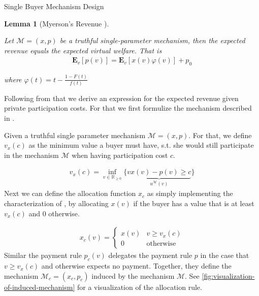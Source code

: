 \documentclass[11pt,a4paper]{article}
\newtheorem{lemma}[theorem]{Lemma}
\newcommand{\RR}{\ensuremath{\mathbb{R}}}
\newcommand{\1}[1]{\mbox{\rm\bf 1}_{#1}}
\begin{document}
\begin{section}{Single Buyer Mechanism Design}
 \begin{lemma}[Myerson's Revenue \cite{myerson}]
     \label{lemma:myerson-revenue}

     Let $\mathcal{M}=(x,p)$ be a truthful single-parameter mechanism, then the expected revenue equals the expected virtual welfare. That is
     \begin{align*}
         \mathbf{E}_v\left[p(v)\right]
         = \mathbf{E}_v\left[x(v)\varphi(v)\right] + p_0
     \end{align*}

     where $\varphi(t) = t - \frac{1 - F(t)}{f(t)}$
 \end{lemma}

 Following from that we derive an expression for the expected revenue given private participation costs.
 For that we first formulize the mechanism described in .

 Given a truthful single parameter mechanism $\mathcal{M}=(x,p)$.
 For that, we define $v_x(c)$ as the minimum value a buyer must have, s.t. she would still participate in the mechanism $\mathcal{M}$ when having participation cost $c$.

 \begin{align*}
     v_x(c) = \inf_{v \in \RR_{\geq 0}} \{\underbrace{vx(v) - p(v) \geq c}_{u^\mathcal{M}(v)}\}
 \end{align*}
 Next we can define the allocation function $x_c$ as simply implementing the characterization of ,
 by allocating $x(v)$ if the buyer has a value that is at least $v_x(c)$ and $0$ otherwise.

 \begin{align*}
     x_c(v) = \begin{cases}
                  x(v) & v \geq v_x(c)    \\
                  0    & \text{otherwise}
              \end{cases}
 \end{align*}
 Similar the payment rule $p_c(v)$ delegates the payment rule $p$ in the case that $v \geq v_x(c)$ and otherwise expects no payment.
 Together, they define the mechanism $\mathcal{M}_c = (x_c, p_c)$ induced by the mechanism $\mathcal{M}$.
 See \cref{fig:visualization-of-induced-mechanism} for a visualization of the allocation rule.

 \begin{figure}[htp!]
     \centering

     \begin{subfigure}{.4\textwidth}
         \centering
\end{subfigure}
\end{figure}
\end{section}
\end{document}
